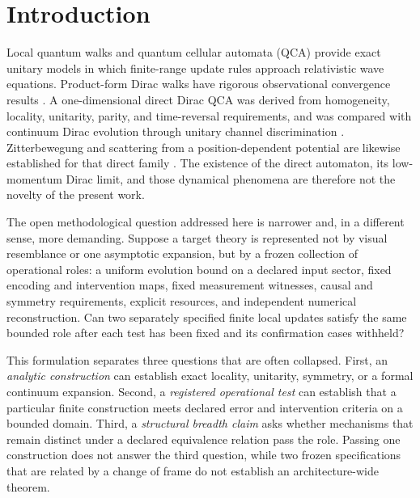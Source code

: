 \section{Introduction}
\label{sec:introduction}

Local quantum walks and quantum cellular automata (QCA) provide exact unitary
models in which finite-range update rules approach relativistic wave
equations.  Product-form Dirac walks have rigorous observational convergence
results \citep{Arrighi2014DiracWalk}.  A one-dimensional direct Dirac QCA was
derived from homogeneity, locality, unitarity, parity, and time-reversal
requirements, and was compared with continuum Dirac evolution through unitary
channel discrimination \citep{Bisio2015QuantumFieldQCA,
DAriano2014InformationPrinciples}.  Zitterbewegung and scattering from a
position-dependent potential are likewise established for that direct family
\citep{Bisio2013DiracQCADynamics}.  The existence of the direct automaton, its
low-momentum Dirac limit, and those dynamical phenomena are therefore not the
novelty of the present work.

The open methodological question addressed here is narrower and, in a
different sense, more demanding.  Suppose a target theory is represented not
by visual resemblance or one asymptotic expansion, but by a frozen collection
of operational roles: a uniform evolution bound on a declared input sector,
fixed encoding and intervention maps, fixed measurement witnesses, causal and
symmetry requirements, explicit resources, and independent numerical
reconstruction.  Can two separately specified finite local updates satisfy the
same bounded role after each test has been fixed and its confirmation cases
withheld?

This formulation separates three questions that are often collapsed.
First, an \emph{analytic construction} can establish exact locality,
unitarity, symmetry, or a formal continuum expansion.  Second, a
\emph{registered operational test} can establish that a particular finite
construction meets declared error and intervention criteria on a bounded
domain.  Third, a \emph{structural breadth claim} asks whether mechanisms that
remain distinct under a declared equivalence relation pass the role.  Passing
one construction does not answer the third question, while two frozen
specifications that are related by a change of frame do not establish an
architecture-wide theorem.


